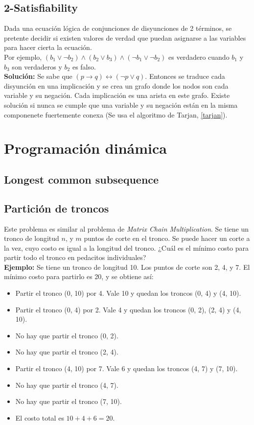 \documentclass[10pt,letterpaper,twocolumn]{article}
\newcommand{\codigofuente}[1]{

\dotfill
}
\begin{document}
\subsection{2-Satisfiability}
Dada una ecuación lógica de conjunciones de disyunciones de 2 términos, se pretente decidir si existen valores de verdad que puedan asignarse a las variables para hacer cierta la ecuación. \\
Por ejemplo, $(b_1 \vee \neg b_2) \wedge (b_2 \vee b_3) \wedge (\neg b_1 \vee \neg b_2) $ es verdadero cuando $b_1$ y $b_3$ son verdaderos y $b_2$ es falso. \\
\textbf{Solución:} Se sabe que $(p \rightarrow q) \leftrightarrow (\neg p \vee q)$. Entonces se traduce cada disyunción en una implicación y se crea un grafo donde los nodos son cada variable y su negación. Cada implicación es una arista en este grafo. Existe solución si nunca se cumple que una variable y su negación están en la misma componenete fuertemente conexa (Se usa el algoritmo de Tarjan, \ref{tarjan}).

\section{Programación dinámica}
\subsection{Longest common subsequence}
\codigofuente{./src/dp/lcs.cpp}
\subsection{Partición de troncos}
Este problema es similar al problema de \textit{Matrix Chain Multiplication}. Se tiene
un tronco de longitud $n$, y $m$ puntos de corte en el tronco. Se puede hacer un corte a la vez,
cuyo costo es igual a la longitud del tronco. ¿Cuál es el mínimo costo para partir todo el tronco
en pedacitos individuales?
\\
\medskip
\textbf{Ejemplo:} Se tiene un tronco de longitud 10. Los puntos de corte son 2, 4, y 7. El mínimo
costo para partirlo es 20, y se obtiene así:
\begin{itemize}
\item Partir el tronco (0, 10) por 4. Vale 10 y quedan los troncos (0, 4) y (4, 10).
\item Partir el tronco (0, 4) por 2. Vale 4 y quedan los troncos (0, 2), (2, 4) y (4, 10).
\item No hay que partir el tronco (0, 2).
\item No hay que partir el tronco (2, 4).
\item Partir el tronco (4, 10) por 7. Vale 6 y quedan los troncos (4, 7) y (7, 10).
\item No hay que partir el tronco (4, 7).
\item No hay que partir el tronco (7, 10).
\item El costo total es $10+4+6 = 20$.
\end{itemize}
\end{document}
